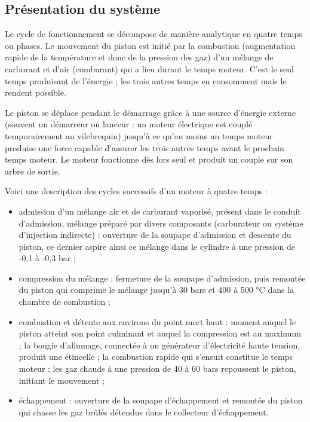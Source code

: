 \subsection{Présentation du système}

Le cycle de fonctionnement se décompose de manière analytique en quatre temps ou phases. Le mouvement du piston est initié par la combustion (augmentation rapide de la température et donc de la pression des gaz) d'un mélange de carburant et d'air (comburant) qui a lieu durant le temps moteur. C'est le seul temps produisant de l'énergie ; les trois autres temps en consomment mais le rendent possible.

Le piston se déplace pendant le démarrage grâce à une source d'énergie externe (souvent un démarreur ou lanceur : un moteur électrique est couplé temporairement au vilebrequin) jusqu'à ce qu'au moins un temps moteur produise une force capable d'assurer les trois autres temps avant le prochain temps moteur. Le moteur fonctionne dès lors seul et produit un couple sur son arbre de sortie.

Voici une description des cycles successifs d'un moteur à quatre temps :

\begin{itemize}
 \item admission d'un mélange air et de carburant vaporisé, présent dans le conduit d'admission, mélange préparé par divers composants (carburateur ou système d'injection indirecte) : ouverture de la soupape d'admission et descente du piston, ce dernier aspire ainsi ce mélange dans le cylindre à une pression de -0,1 à -0,3 bar ;
 \item compression du mélange : fermeture de la soupape d'admission, puis remontée du piston qui comprime le mélange jusqu'à 30 bars et 400 à 500 °C dans la chambre de combustion ;
 \item combustion et détente aux environs du point mort haut : moment auquel le piston atteint son point culminant et auquel la compression est au maximum ; la bougie d'allumage, connectée à un générateur d'électricité haute tension, produit une étincelle ; la combustion rapide qui s'ensuit constitue le temps moteur ; les gaz chauds à une pression de 40 à 60 bars repoussent le piston, initiant le mouvement ;
 \item échappement : ouverture de la soupape d'échappement et remontée du piston qui chasse les gaz brûlés détendus dans le collecteur d'échappement.
\end{itemize}

